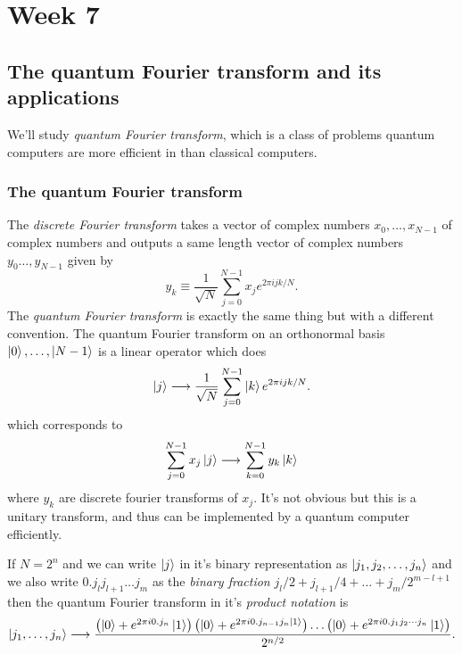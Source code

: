 \part{Week 7}
\chapter{The quantum Fourier transform and its applications}
We'll study \textit{quantum Fourier transform}, which is a class of problems quantum computers are more efficient in than classical computers.

\section{The quantum Fourier transform}
The \textit{discrete Fourier transform} takes a vector of complex numbers $x_0,\dots,x_{N-1}$ of complex numbers and outputs a same length vector of complex numbers $y_0\dots,y_{N-1}$ given by
\begin{equation}
    y_k \equiv \frac{1}{\sqrt{N}}\sum_{j=0}^{N-1}x_je^{2\pi ijk/N}.
\end{equation}
The \textit{quantum Fourier transform} is exactly the same thing but with a different convention. The quantum Fourier transform on an orthonormal basis $\ket{0},\dots,\ket{N-1}$ is a linear operator which does
\begin{equation}
    \ket{j} \longrightarrow \frac{1}{\sqrt{N}}\sum_{j=0}^{N-1}\ket{k}e^{2\pi ijk/N}.
\end{equation}
which corresponds to
\begin{equation}
    \sum_{j=0}^{N-1}x_j\ket{j} \longrightarrow \sum_{k=0}^{N-1}y_k\ket{k}
\end{equation}
where $y_k$ are discrete fourier transforms of $x_j$. It's not obvious but this is a unitary transform, and thus can be implemented by a quantum computer efficiently.

If $N=2^n$ and we can write $\ket{j}$ in it's binary representation as $\ket{j_1,j_2,\dots, j_n}$ and we also write $0.j_lj_{l+1}\dots j_m$ as the \textit{binary fraction} $j_l/2+j_{l+1}/4 + \dots + j_m/2^{m-l+1}$ then the quantum Fourier transform in it's \textit{product notation} is
\begin{equation}
    \ket{j_1,\dots,j_n} \longrightarrow \frac{\left(\ket{0} + e^{2\pi i 0.j_n}\ket{1} \right)\left(\ket{0} + e^{2\pi i 0.j_{n-1}j_n\ket{1}}\right)\dots\left(\ket{0} + e^{2\pi i 0.j_1j_2\cdots j_n}\ket{1}\right)}{2^{n/2}}.
\end{equation}

